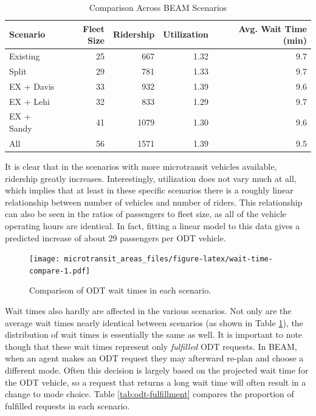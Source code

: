 \documentclass[
]{article}
\begin{document}
\begin{table}

\caption{\label{tab:scenario-compare}Comparison Across BEAM Scenarios}
\centering
\begin{tabular}[t]{lrrrr}
\toprule
Scenario & Fleet Size & Ridership & Utilization & Avg. Wait Time (min)\\
\midrule
Existing & 25 & 667 & 1.32 & 9.7\\
Split & 29 & 781 & 1.33 & 9.7\\
EX + Davis & 33 & 932 & 1.39 & 9.6\\
EX + Lehi & 32 & 833 & 1.29 & 9.7\\
EX + Sandy & 41 & 1079 & 1.30 & 9.6\\
\addlinespace
All & 56 & 1571 & 1.39 & 9.5\\
\bottomrule
\end{tabular}
\end{table}

It is clear that in the scenarios with more microtransit vehicles available, ridership greatly increases. Interestingly, utilization does not vary much at all, which implies that at least in these specific scenarios there is a roughly linear relationship between number of vehicles and number of riders. This relationship can also be seen in the ratios of passengers to fleet size, as all of the vehicle operating hours are identical. In fact, fitting a linear model to this data gives a predicted increase of about 29 passengers per ODT vehicle.

\begin{figure}
\centering
\texttt{[image: microtransit\_areas\_files/figure-latex/wait-time-compare-1.pdf]}
\caption{\label{fig:wait-time-compare}Comparison of ODT wait times in each scenario.}
\end{figure}

Wait times also hardly are affected in the various scenarios. Not only are the average wait times nearly identical between scenarios (as shown in Table \ref{tab:scenario-compare}), the distribution of wait times is essentially the same as well. It is important to note though that these wait times represent only \emph{fulfilled} ODT requests. In BEAM, when an agent makes an ODT request they may afterward re-plan and choose a different mode. Often this decision is largely based on the projected wait time for the ODT vehicle, so a request that returns a long wait time will often result in a change to mode choice. Table \ref{tab:odt-fulfillment} compares the proportion of fulfilled requests in each scenario.
\end{document}
